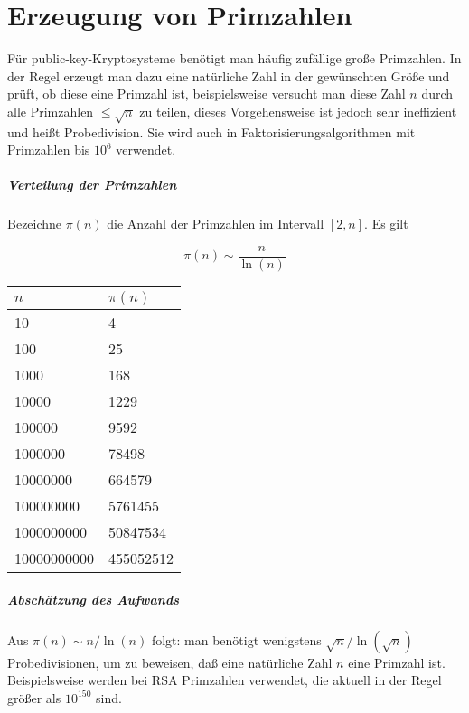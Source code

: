 \chapter{Erzeugung von Primzahlen}

Für public-key-Kryptosysteme benötigt man häufig zufällige große Primzahlen. In der Regel erzeugt man dazu eine natürliche Zahl in der gewünschten Größe und
prüft, ob diese eine Primzahl ist, beispielsweise versucht man diese Zahl $n$ durch alle Primzahlen $\leq \sqrt{n}$ zu teilen, dieses Vorgehensweise ist jedoch sehr 
ineffizient und heißt Probedivision. Sie wird auch in Faktorisierungsalgorithmen mit Primzahlen bis $10^6$ verwendet.

\paragraph{Verteilung der Primzahlen}

Bezeichne $\pi(n)$ die Anzahl der Primzahlen im Intervall $[2, n]$. Es gilt 

$$\pi(n) \sim \frac{n}{\ln(n)} $$


\begin{center}
    \begin{tabular}{ ll } 
        \hline
        $n$ & $\pi(n)$  \\ 
        \hline
                 10 &         4 \\
                100 &        25 \\
               1000 &       168 \\
              10000 &      1229 \\
             100000 &      9592 \\
            1000000 &     78498 \\
           10000000 &    664579 \\
          100000000 &   5761455 \\
         1000000000 &  50847534 \\
        10000000000 & 455052512 \\
        \hline
    \end{tabular}
\end{center}

\paragraph{Abschätzung des Aufwands}

Aus $\pi(n) \sim n / \ln(n)$ folgt: man benötigt wenigstens $\sqrt{n} / \ln(\sqrt{n})$ Probedivisionen, um zu
beweisen, daß eine natürliche Zahl $n$ eine Primzahl ist.
Beispielsweise werden bei RSA Primzahlen verwendet, die aktuell in der Regel größer als
$10^{150}$ sind.\\

